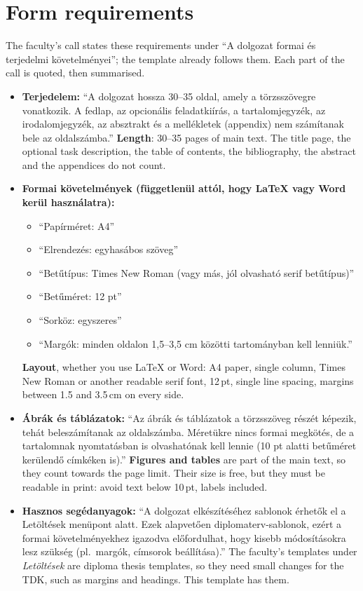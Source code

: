 \section{Form requirements}\label{guide:tdk:form}
The faculty's call states these requirements under \enquote{A dolgozat formai és terjedelmi követelményei}; the template already follows them. Each part of the call is quoted, then summarised.
\begin{itemize}
  \item \textbf{Terjedelem:} \enquote{A dolgozat hossza 30--35 oldal, amely a törzsszövegre vonatkozik. A fedlap, az opcionális feladatkiírás, a tartalomjegyzék, az irodalomjegyzék, az absztrakt és a mellékletek (appendix) nem számítanak bele az oldalszámba.}
  \textbf{Length}: 30--35 pages of main text. The title page, the optional task description, the table of contents, the bibliography, the abstract and the appendices do not count.
  \item \textbf{Formai követelmények (függetlenül attól, hogy LaTeX vagy Word kerül használatra):}
  \begin{itemize}[noitemsep]
    \item \enquote{Papírméret: A4}
    \item \enquote{Elrendezés: egyhasábos szöveg}
    \item \enquote{Betűtípus: Times New Roman (vagy más, jól olvasható serif betűtípus)}
    \item \enquote{Betűméret: 12 pt}
    \item \enquote{Sorköz: egyszeres}
    \item \enquote{Margók: minden oldalon 1,5--3,5 cm közötti tartományban kell lenniük.}
  \end{itemize}
  \textbf{Layout}, whether you use \LaTeX{} or Word: A4 paper, single column, Times New Roman or another readable serif font, 12\,pt, single line spacing, margins between 1.5 and 3.5\,cm on every side.
  \item \textbf{Ábrák és táblázatok:} \enquote{Az ábrák és táblázatok a törzsszöveg részét képezik, tehát beleszámítanak az oldalszámba. Méretükre nincs formai megkötés, de a tartalomnak nyomtatásban is olvashatónak kell lennie (10 pt alatti betűméret kerülendő címkéken is).}
  \textbf{Figures and tables} are part of the main text, so they count towards the page limit. Their size is free, but they must be readable in print: avoid text below 10\,pt, labels included.
  \item \textbf{Hasznos segédanyagok:} \enquote{A dolgozat elkészítéséhez sablonok érhetők el a Letöltések menüpont alatt. Ezek alapvetően diplomaterv-sablonok, ezért a formai követelményekhez igazodva előfordulhat, hogy kisebb módosításokra lesz szükség (pl.\ margók, címsorok beállítása).}
  The faculty's templates under \emph{Letöltések} are diploma thesis templates, so they need small changes for the TDK, such as margins and headings. This template has them.
\end{itemize}
